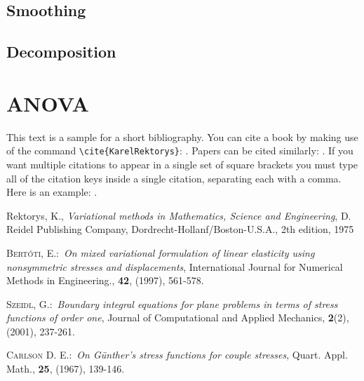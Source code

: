 \documentclass{tufte-book}\usepackage[]{graphicx}\usepackage[]{xcolor}
\begin{document}
\subsection{Smoothing}

\subsection{Decomposition}


\section{ANOVA}



This text is a sample for a short bibliography. You can cite a
book by making use of the command \verb"\cite{KarelRektorys}":
\cite{KarelRektorys}. Papers can be cited similarly:
\cite{Bertoti97}. If you want multiple citations to appear in a
single set of square brackets you must type all of the citation
keys inside a single citation, separating each with a comma. Here
is an example: \cite{Bertoti97, Szeidl2001, Carlson67}.

\begin{thebibliography}{9}
Rektorys, K., \textit{Variational methods in Mathematics,
Science and Engineering}, D. Reidel Publishing Company,
Dordrecht-Hollanf/Boston-U.S.A., 2th edition, 1975

 \textsc{Bert\'{o}ti, E.}:\ \textit{On mixed variational formulation
of linear elasticity using nonsymmetric stresses and
displacements}, International Journal for Numerical Methods in
Engineering., \textbf{42}, (1997), 561-578.

 \textsc{Szeidl, G.}:\ \textit{Boundary integral equations for
plane problems in terms of stress functions of order one}, Journal
of Computational and Applied Mechanics, \textbf{2}(2), (2001),
237-261.

  \textsc{Carlson D. E.}:\ \textit{On G\"{u}nther's stress functions
for couple stresses}, Quart. Appl. Math., \textbf{25}, (1967),
139-146.
\end{thebibliography}
\end{document}
